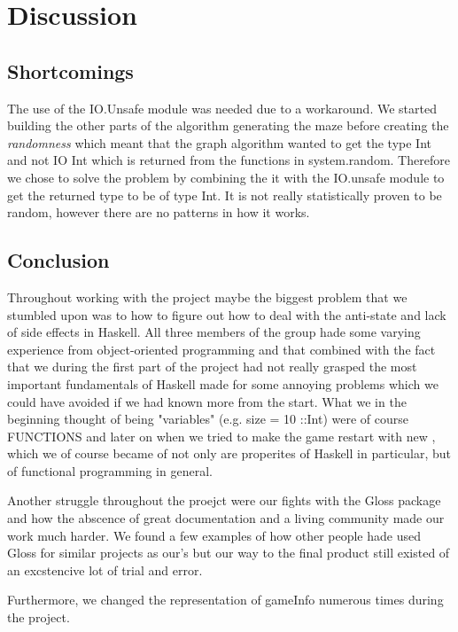 \documentclass[12pt, a4paper]{article}
\begin{document}
\newpage
\section{Discussion}
\subsection{Shortcomings}
The use of the IO.Unsafe module was needed due to a workaround. We started building the other parts of the algorithm generating  the maze  before creating the \textit{randomness} which meant that the graph algorithm wanted to get the type Int and not IO Int which is returned from the functions in system.random. Therefore we chose to solve the problem by combining the it  with the IO.unsafe module to get the returned type to be of type Int. It is not really statistically proven to be random, however there are no patterns in how it works.


\subsection{Conclusion}
Throughout working with the project maybe the biggest problem that we stumbled upon was to how to figure out how to deal with the anti-state and lack of side effects in Haskell. All three members of the group hade some varying experience from object-oriented programming and that combined with the fact that we during the first part of the project had not really grasped the most important fundamentals of Haskell made for some annoying problems which we could have avoided if we had known more from the start. What we in the beginning thought of being "variables" (e.g. size = 10 ::Int) were of course FUNCTIONS and later on when we tried to make the game restart with new , which we of course became of not only are properites of Haskell in particular, but of functional programming in general. 

Another struggle throughout the proejct were our fights with the Gloss package and how the abscence of great documentation and a living community made our work much harder. We found a few examples of how other people hade used Gloss for similar projects as our's but our way to the final product still existed of an excstencive lot of trial and error.

Furthermore, we changed the representation of gameInfo numerous times during the project. 
\end{document}
